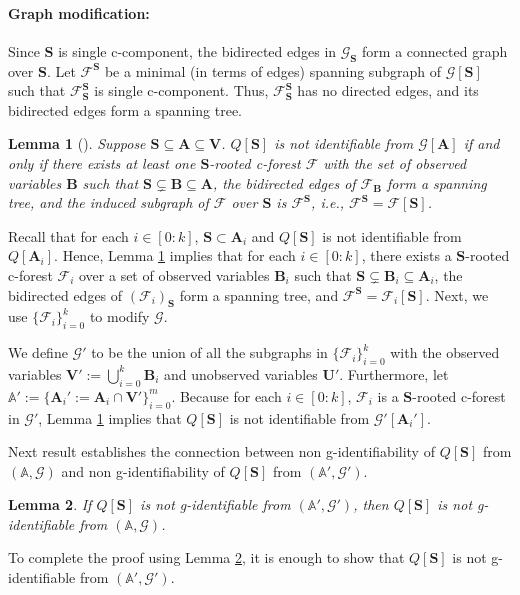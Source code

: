 \documentclass[accepted]{uai2022}
\newtheorem{lemma}{Lemma}
\newcommand{\V}[0]{\mathbf{V}}
\newcommand{\U}[0]{\mathbf{U}}
\newcommand{\A}[0]{\mathbf{A}}
\newcommand{\B}[0]{\mathbf{B}}
\newcommand{\G}[0]{\mathcal{G}}
\newcommand{\F}[0]{\mathcal{F}}
\begin{document}
    \paragraph{Graph modification:}\label{sec: graph-mod}
    Since $\mathbf{S}$ is single c-component, the bidirected edges in $\G_{\mathbf{S}}$ form a connected graph over $\mathbf{S}$. 
    Let $\F^{\mathbf{S}}$ be a minimal (in terms of edges) spanning subgraph of $\G[\mathbf{S}]$ such that $\F^{\mathbf{S}}_{\mathbf{S}}$ is single c-component. 
    Thus, $\F^{\mathbf{S}}_{\mathbf{S}}$ has no directed edges, and its bidirected edges form a spanning tree.
    \begin{lemma}[\cite{shpitser2006identification}] \label{lem: c-forest existence}
        Suppose \mbox{$\mathbf{S} \subseteq\A \subseteq \V$}. 
        $Q[\mathbf{S}]$ is not identifiable from $\G[\A]$ if and only if there exists at least one $\mathbf{S}$-rooted c-forest  $\mathcal{F}$ with the set of observed variables $\B$ such that $\mathbf{S}\subsetneq \B \subseteq \A$, the bidirected edges of $\F_{\B}$ form a spanning tree, and the induced subgraph of $\mathcal{F}$ over $\mathbf{S}$ is $\mathcal{F}^{\mathbf{S}}$, i.e.,  $\mathcal{F}^{\mathbf{S}}= \mathcal{F}[\mathbf{S}]$.
    \end{lemma}
    Recall that for each $i \in [0:k]$, $\mathbf{S}\subset \A_i$ and $Q[\mathbf{S}]$ is not identifiable from $Q[\A_i]$. 
    Hence, Lemma \ref{lem: c-forest existence} implies that for each $i\in [0:k]$, there exists a $\mathbf{S}$-rooted c-forest $\mathcal{F}_i$ over a set of observed variables $\B_i$ such that $\mathbf{S}\subsetneq \B_i \subseteq \A_i$, the bidirected edges of $(\mathcal{F}_i)_{\mathbf{S}}$ form a spanning tree, and $\mathcal{F}^{\mathbf{S}} = \mathcal{F}_i[\mathbf{S}]$. 
    Next, we use $\{\mathcal{F}_i\}_{i=0}^k$ to modify $\G$.

    We define $\G'$ to be the union of all the subgraphs in $\{\mathcal{F}_i\}_{i=0}^k$ with the observed variables $\V' := \bigcup_{i=0}^k \B_i$ and unobserved variables $\U'$.
    Furthermore, let $\mathbb{A}':= \{\A_i':=\A_i \cap \V'\}_{i=0}^m$. 
    Because for each $i\in [0:k]$, $\mathcal{F}_i$ is a $\mathbf{S}$-rooted c-forest in $\G'$, Lemma \ref{lem: c-forest existence} implies that $Q[\mathbf{S}]$ is not identifiable from $\G'[\A_i']$.

    Next result establishes the connection between non g-identifiability of $Q[\mathbf{S}]$ from $(\mathbb{A}, \G)$ and non g-identifiability of $Q[\mathbf{S}]$ from $(\mathbb{A}', \G')$.
    \begin{lemma} \label{lem: simplify}
        If $Q[\mathbf{S}]$ is not g-identifiable from $(\mathbb{A}', \G')$, then $Q[\mathbf{S}]$ is not g-identifiable from $(\mathbb{A}, \G)$.
    \end{lemma}
    To complete the proof using Lemma \ref{lem: simplify}, it is enough to show that $Q[\mathbf{S}]$ is not g-identifiable from $(\mathbb{A}', \G')$.
    
\end{document}
